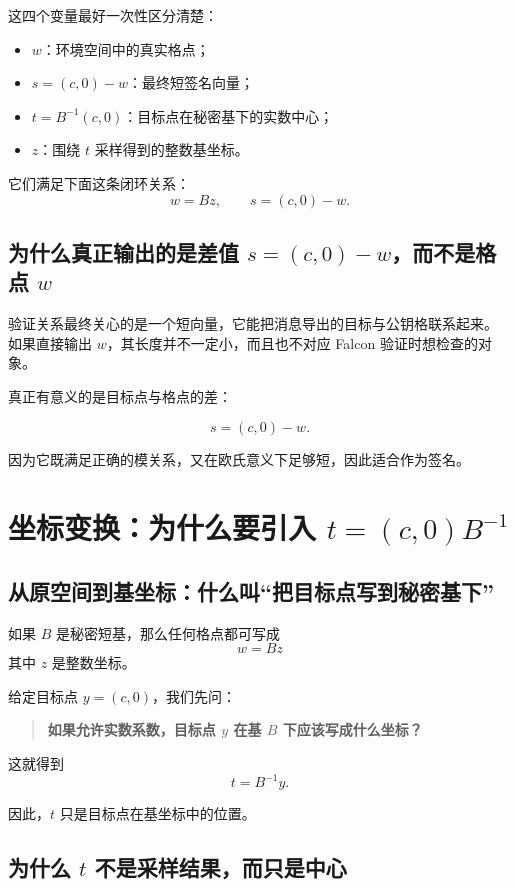 \documentclass[11pt,a4paper]{ctexart}
\begin{document}
这四个变量最好一次性区分清楚：

\begin{itemize}
    \item \(w\)：环境空间中的真实格点；
    \item \(s=(c,0)-w\)：最终短签名向量；
    \item \(t=B^{-1}(c,0)\)：目标点在秘密基下的实数中心；
    \item \(z\)：围绕 \(t\) 采样得到的整数基坐标。
\end{itemize}

它们满足下面这条闭环关系：
\[
w=Bz,\qquad s=(c,0)-w.
\]

\subsection{为什么真正输出的是差值 \(s=(c,0)-w\)，而不是格点 \(w\)}

验证关系最终关心的是一个短向量，它能把消息导出的目标与公钥格联系起来。  
如果直接输出 \(w\)，其长度并不一定小，而且也不对应 Falcon 验证时想检查的对象。

真正有意义的是目标点与格点的差：

\[
s=(c,0)-w.
\]

因为它既满足正确的模关系，又在欧氏意义下足够短，因此适合作为签名。

\section{坐标变换：为什么要引入 \(t=(c,0)B^{-1}\)}

\subsection{从原空间到基坐标：什么叫“把目标点写到秘密基下”}

如果 \(B\) 是秘密短基，那么任何格点都可写成
\[
w=Bz
\]
其中 \(z\) 是整数坐标。

给定目标点 \(y=(c,0)\)，我们先问：

\begin{quote}
\textbf{如果允许实数系数，目标点 \(y\) 在基 \(B\) 下应该写成什么坐标？}
\end{quote}

这就得到
\[
t=B^{-1}y.
\]

因此，\(t\) 只是目标点在基坐标中的位置。

\subsection{为什么 \(t\) 不是采样结果，而只是中心}
\end{document}
